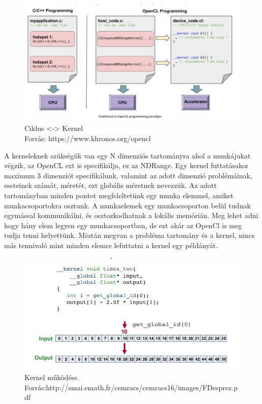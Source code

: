 \begin{figure}[h]
\centering
\includegraphics[scale=0.4]{images/loopvskernel.jpg}
\caption{Ciklus <-> Kernel \\ Forrás: https://www.khronos.org/opencl}
\label{fig:loopVsKernel}
\end{figure}

 A kerneleknek szükségük van egy N dimenziós tartományra ahol a munkájukat végzik, az OpenCL  ezt is specifikálja, ez az NDRange. Egy kernel futtatásakor maximum 3 dimenziót specifikálunk, valamint az adott dimenzió problémáinak, eseteinek számát, méretét, ezt globális méretnek nevezzük. Az adott tartományban minden pontot megfeleltetünk egy munka elemmel, amiket munkacsoportokra osztunk. A munkaelemek egy munkacsoporton belül tudnak egymással kommunikálni, és osztozkodhatnak a lokális memórián. Meg lehet adni hogy hány elem legyen egy munkacsoportban, de ezt akár az OpenCl is meg tudja tenni helyettünk. Miután megvan a probléma tartomány és a  kernel, nincs más tennivaló mint minden elemre lefuttatni a kernel egy példányát.
 
\begin{figure}[h]
\centering
\includegraphics[scale=0.7]{images/kernel.jpg}
\caption{Kernel működése. \\ Forrás:http://smai.emath.fr/cemracs/cemracs16/images/FDesprez.pdf}
\label{fig:kernel}
\end{figure}

